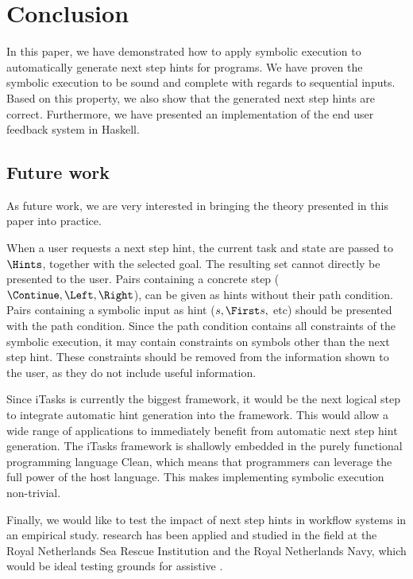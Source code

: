 
\section{Conclusion}
\label{sec:conclusion}

In this paper, we have demonstrated how to apply symbolic execution to automatically generate next step hints for \TOPHAT programs.
We have proven the symbolic execution to be sound and complete with regards to sequential inputs.
Based on this property, we also show that the generated next step hints are correct.
Furthermore, we have presented an implementation of the end user feedback system in Haskell.


\subsection{Future work}

As future work, we are very interested in bringing the theory presented in this paper into practice.

When a user requests a next step hint, the current task and state are passed to $\Hints$, together with the selected goal.
The resulting set cannot directly be presented to the user.
Pairs containing a concrete step ($\Continue,\Left,\Right$), can be given as hints without their path condition.
Pairs containing a symbolic input as hint ($s,\First s,$ etc) should be presented with the path condition.
Since the path condition contains all constraints of the symbolic execution, it may contain constraints on symbols other than the next step hint.
These constraints should be removed from the information shown to the user, as they do not include useful information.

Since iTasks is currently the biggest \TOP framework, it would be the next logical step to integrate automatic hint generation into the framework.
This would allow a wide range of applications to immediately benefit from automatic next step hint generation.
The iTasks framework is shallowly embedded in the purely functional programming language Clean,
which means that programmers can leverage the full power of the host language.
This makes implementing symbolic execution non-trivial.


Finally, we would like to test the impact of next step hints in workflow systems in an empirical study.
\TOP research has been applied and studied in the field at the Royal Netherlands Sea Rescue Institution and the Royal Netherlands Navy, which would be ideal testing grounds for assistive \TOPHAT.
